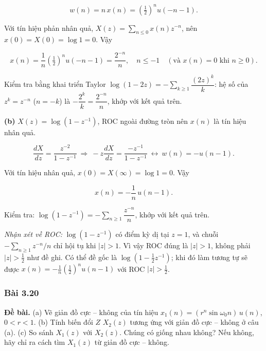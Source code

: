 \documentclass[12pt,a4paper]{article}
\begin{document}
\[w(n)=n\,x(n)=\left(\tfrac12\right)^nu(-n-1).\]

Với tín hiệu phản nhân quả, \(X(z)=\sum_{n\le0}x(n)z^{-n}\), nên
\(x(0)=X(0)=\log1=0\). Vậy

\[x(n)=\frac1n\left(\tfrac12\right)^nu(-n-1)=\frac{2^{-n}}{n},\quad n\le-1\quad(\text{và }x(n)=0\text{ khi }n\ge0).\]

Kiểm tra bằng khai triển Taylor
\(\log(1-2z)=-\sum_{k\ge1}\dfrac{(2z)^k}{k}\): hệ số của
\(z^{k}=z^{-n}\) (\(n=-k\)) là \(-\dfrac{2^k}{k}=\dfrac{2^{-n}}{n}\),
khớp với kết quả trên.

\textbf{(b)} \(X(z)=\log(1-z^{-1})\), ROC ngoài đường tròn nên \(x(n)\)
là tín hiệu nhân quả.

\[\frac{dX}{dz}=\frac{z^{-2}}{1-z^{-1}}\ \Rightarrow\ -z\frac{dX}{dz}=\frac{-z^{-1}}{1-z^{-1}}\ \leftrightarrow\ w(n)=-u(n-1).\]

Với tín hiệu nhân quả, \(x(0)=X(\infty)=\log1=0\). Vậy

\[x(n)=-\frac1n\,u(n-1).\]

Kiểm tra: \(\log(1-z^{-1})=-\sum_{n\ge1}\dfrac{z^{-n}}{n}\), khớp với
kết quả trên.

\emph{Nhận xét về ROC:} \(\log(1-z^{-1})\) có điểm kỳ dị tại \(z=1\), và
chuỗi \(-\sum_{n\ge1}z^{-n}/n\) chỉ hội tụ khi \(|z|>1\). Vì vậy ROC
đúng là \(|z|>1\), không phải \(|z|>\tfrac12\) như đề ghi. Có thể đề gốc
là \(\log\left(1-\tfrac12z^{-1}\right)\); khi đó làm tương tự sẽ được
\(x(n)=-\tfrac1n\left(\tfrac12\right)^nu(n-1)\) với ROC
\(|z|>\tfrac12\).

\subsubsection*{Bài 3.20}
\textbf{Đề bài.} (a) Vẽ giản đồ cực -- không của tín hiệu $x_1(n) = (r^n\sin\omega_0 n)\,u(n)$, $0<r<1$.
(b) Tính biến đổi $Z$ $X_2(z)$ tương ứng với giản đồ cực -- không ở câu (a).
(c) So sánh $X_1(z)$ với $X_2(z)$. Chúng có giống nhau không? Nếu không, hãy chỉ ra cách tìm $X_1(z)$ từ giản đồ cực -- không.
\end{document}
